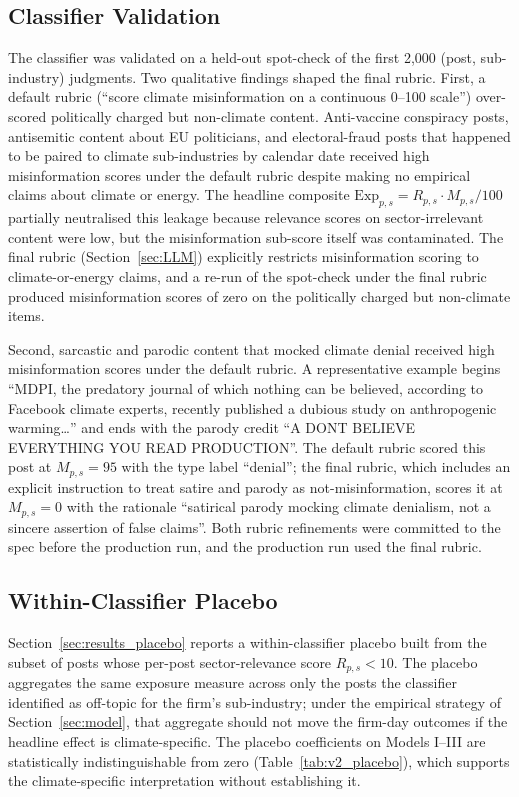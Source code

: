 \documentclass{article}
\theoremstyle{plain}
\begin{document}
\subsection{Classifier Validation}
The classifier was validated on a held-out spot-check of the first 2,000 (post,
sub-industry) judgments. Two qualitative findings shaped the final rubric. First, a
default rubric (``score climate misinformation on a continuous 0--100 scale'')
over-scored politically charged but non-climate content. Anti-vaccine conspiracy
posts, antisemitic content about EU politicians, and electoral-fraud posts that
happened to be paired to climate sub-industries by calendar date received high
misinformation scores under the default rubric despite making no empirical claims
about climate or energy. The headline composite $\mathrm{Exp}_{p,s}=R_{p,s}\cdot
M_{p,s}/100$ partially neutralised this leakage because relevance scores on
sector-irrelevant content were low, but the misinformation sub-score itself was
contaminated. The final rubric (Section~\ref{sec:LLM}) explicitly restricts
misinformation scoring to climate-or-energy claims, and a re-run of the spot-check
under the final rubric produced misinformation scores of zero on the politically
charged but non-climate items.

Second, sarcastic and parodic content that mocked climate denial received high
misinformation scores under the default rubric. A representative example begins
``MDPI, the predatory journal of which nothing can be believed, according to
Facebook climate experts, recently published a dubious study on anthropogenic
warming\ldots'' and ends with the parody credit ``A DONT BELIEVE EVERYTHING YOU
READ PRODUCTION''. The default rubric scored this post at $M_{p,s}=95$ with the
type label ``denial''; the final rubric, which includes an explicit instruction to
treat satire and parody as not-misinformation, scores it at $M_{p,s}=0$ with the
rationale ``satirical parody mocking climate denialism, not a sincere assertion of
false claims''. Both rubric refinements were committed to the spec before the
production run, and the production run used the final rubric.

\subsection{Within-Classifier Placebo}
Section~\ref{sec:results_placebo} reports a within-classifier placebo built from
the subset of posts whose per-post sector-relevance score $R_{p,s}<10$. The
placebo aggregates the same exposure measure across only the posts the classifier
identified as off-topic for the firm's sub-industry; under the empirical
strategy of Section~\ref{sec:model}, that aggregate should not move the firm-day
outcomes if the headline effect is climate-specific. The placebo coefficients on
Models I--III are statistically indistinguishable from zero
(Table~\ref{tab:v2_placebo}), which supports the climate-specific
interpretation without establishing it.
\end{document}
